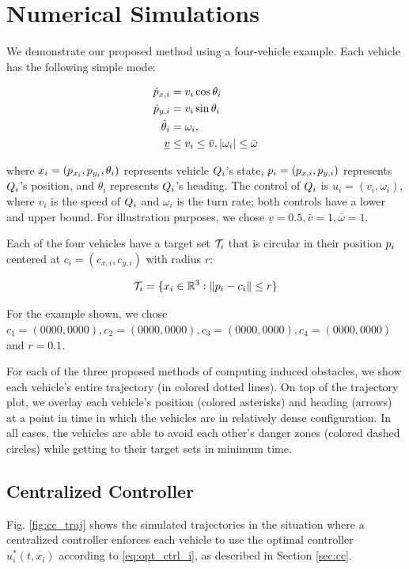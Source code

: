 \section{Numerical Simulations \label{sec:sim}}
We demonstrate our proposed method using a four-vehicle example. Each vehicle has the following simple mode:

\begin{equation}
\label{eq:dyn_i}
\begin{aligned}
\dot{p}_{x,i} &= v_i \cos \theta_i \\
\dot{p}_{y,i} &= v_i \sin \theta_i \\
\dot{\theta}_i &= \omega_i, \\
\underline{v} &\le v_i \le \bar{v}, |\omega_i| \le \bar{\omega}
\end{aligned}
\end{equation}

\noindent where $x_i = (p_{x_i}, p_{y_i}, \theta_i)$ represents vehicle $Q_i$'s state, $p_i = (p_{x,i}, p_{y,i})$ represents $Q_i$'s position, and $\theta_i$ represents $Q_i$'s heading. The control of $Q_i$ is $u_i = (v_i, \omega_i)$, where $v_i$ is the speed of $Q_i$ and $\omega_i$ is the turn rate; both controls have a lower and upper bound. For illustration purposes, we chose $\underline{v} = 0.5, \bar{v} = 1, \bar\omega = 1$.

Each of the four vehicles have a target set $\mathcal{T}_i$ that is circular in their position $p_i$ centered at $c_i = (c_{x,i}, c_{y,i})$ with radius $r$:

\begin{equation}
\mathcal{T}_i = \{x_i \in \mathbb{R}^3: \|p_i - c_i\| \le r\}
\end{equation}

For the example shown, we chose $c_1 = (0000, 0000), c_2 = (0000, 0000), c_3 = (0000, 0000), c_4 = (0000, 0000)$ and $r = 0.1$. 

For each of the three proposed methods of computing induced obstacles, we show each vehicle's entire trajectory (in colored dotted lines). On top of the trajectory plot, we overlay each vehicle's position (colored asterisks) and heading (arrows) at a point in time in which the vehicles are in relatively dense configuration. In all cases, the vehicles are able to avoid each other's danger zones (colored dashed circles) while getting to their target sets in minimum time.

\subsection{Centralized Controller}
Fig. \ref{fig:cc_traj} shows the simulated trajectories in the situation where a centralized controller enforces each vehicle to use the optimal controller $u^*_i(t, x_i)$ according to \eqref{eq:opt_ctrl_i}, as described in Section \ref{sec:cc}.

